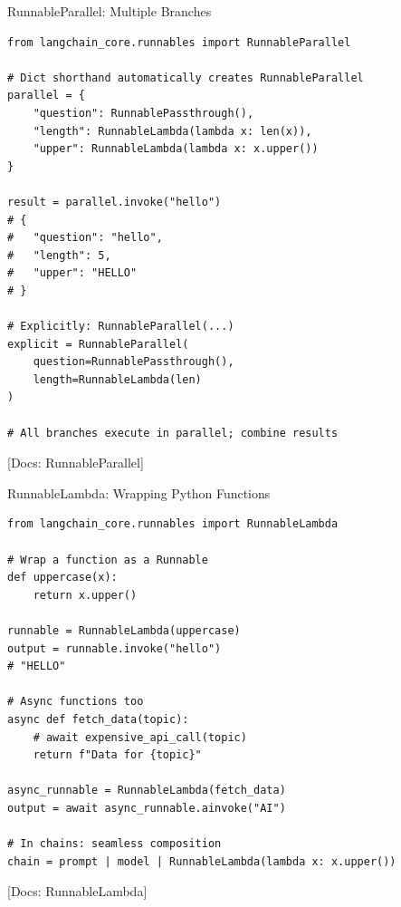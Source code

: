\documentclass[aspectratio=169,11pt]{beamer}
\newcommand{\docref}[1]{{\scriptsize\color{docgray}[Docs: #1]}}
\begin{document}
\begin{frame}[fragile]{RunnableParallel: Multiple Branches}
  \begin{codebox}
\begin{lstlisting}
from langchain_core.runnables import RunnableParallel

# Dict shorthand automatically creates RunnableParallel
parallel = {
    "question": RunnablePassthrough(),
    "length": RunnableLambda(lambda x: len(x)),
    "upper": RunnableLambda(lambda x: x.upper())
}

result = parallel.invoke("hello")
# {
#   "question": "hello",
#   "length": 5,
#   "upper": "HELLO"
# }

# Explicitly: RunnableParallel(...)
explicit = RunnableParallel(
    question=RunnablePassthrough(),
    length=RunnableLambda(len)
)

# All branches execute in parallel; combine results
\end{lstlisting}
  \end{codebox}

  \docref{RunnableParallel}
\end{frame}

\begin{frame}[fragile]{RunnableLambda: Wrapping Python Functions}
  \begin{codebox}
\begin{lstlisting}
from langchain_core.runnables import RunnableLambda

# Wrap a function as a Runnable
def uppercase(x):
    return x.upper()

runnable = RunnableLambda(uppercase)
output = runnable.invoke("hello")
# "HELLO"

# Async functions too
async def fetch_data(topic):
    # await expensive_api_call(topic)
    return f"Data for {topic}"

async_runnable = RunnableLambda(fetch_data)
output = await async_runnable.ainvoke("AI")

# In chains: seamless composition
chain = prompt | model | RunnableLambda(lambda x: x.upper())
\end{lstlisting}
  \end{codebox}

  \docref{RunnableLambda}
\end{frame}
\end{document}
